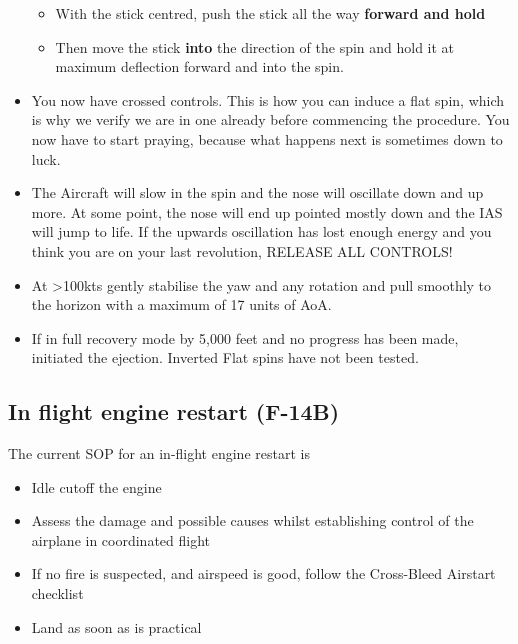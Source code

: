 \begin{itemize}
\begin{itemize}
    \item With the stick centred, push the stick all the way \textbf{forward
      and hold}

    \item Then move the stick \textbf{into} the direction of the spin and hold
      it at maximum deflection forward and into the spin.

  \end{itemize}

  \item You now have crossed controls. This is how you can induce a flat spin,
    which is why we verify we are in one already before commencing the
    procedure. You now have to start praying, because what happens next is
    sometimes down to luck.

  \item The Aircraft will slow in the spin and the nose will oscillate down and
    up more. At some point, the nose will end up pointed mostly down and the
    IAS will jump to life. If the upwards oscillation has lost enough energy
    and you think you are on your last revolution, RELEASE ALL CONTROLS!

  \item At >100kts gently stabilise the yaw and any rotation and pull smoothly
    to the horizon with a maximum of 17 units of AoA.

  \item If in full recovery mode by 5,000 feet and no progress has been made,
    initiated the ejection. Inverted Flat spins have not been tested.

\end{itemize}

\newpage

\subsection{In flight engine restart (F-14B)}

The current SOP for an in-flight engine restart is

\begin{itemize}

  \item Idle cutoff the engine

  \item Assess the damage and possible causes whilst establishing control of
    the airplane in coordinated flight

  \item If no fire is suspected, and airspeed is good, follow the Cross-Bleed
    Airstart checklist


  \item Land as soon as is practical

\end{itemize}

